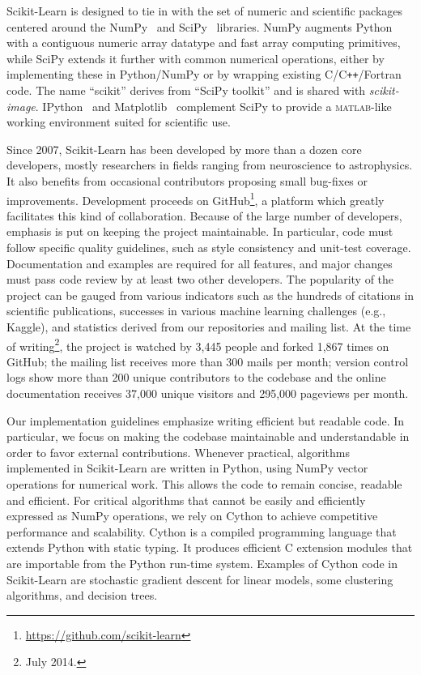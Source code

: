 Scikit-Learn is designed to tie in with the set of numeric and scientific
packages centered around the NumPy~\citep{oliphant:2007} and
SciPy~\citep{vanderwalt:2011} libraries. NumPy augments Python with a
contiguous numeric array datatype and fast array computing primitives, while
SciPy extends it further with common numerical operations, either by
implementing these in Python/NumPy or by wrapping existing
C/C{}\verb!++!/Fortran code. The name ``scikit'' derives from ``SciPy toolkit''
and is shared with \textit{scikit-image}. IPython~\citep{perez:2007} and
Matplotlib~\citep{hunter:2007} complement SciPy to provide a
\textsc{matlab}-like working environment suited for scientific use.

Since 2007, Scikit-Learn has been developed by more than a dozen core
developers, mostly researchers in fields ranging from neuro\-science to
astro\-physics. It also benefits from occasional contributors proposing small
bug-fixes or improvements. Development proceeds on
GitHub\footnote{\url{https://github.com/scikit-learn}}, a platform which
greatly facilitates this kind of collaboration. Because of the large number of
developers, emphasis is put on keeping the project maintainable. In particular,
code must follow specific quality guidelines, such as style consistency and
unit-test coverage. Documentation and examples are required for all features,
and major changes must pass code review by at least two other developers.
The popularity of the project can be gauged from various indicators such as the hundreds
of citations in scientific publications, successes in various machine learning
challenges (e.g., Kaggle), and statistics derived from our
repositories and mailing list.  At the time of writing\footnote{July 2014.}, the project is watched
by 3,445 people and forked 1,867 times on GitHub; the mailing list receives more
than 300 mails per month; version control logs
show more than 200 unique contributors to the codebase and the online documentation
receives 37,000 unique visitors and 295,000 pageviews per month.

Our implementation guidelines emphasize writing efficient but readable code. In
particular, we focus on making the codebase maintainable and understandable in
order to favor external contributions. Whenever practical, algorithms
implemented in Scikit-Learn are written in Python, using NumPy vector
operations for numerical work. This allows the code to remain concise, readable
and efficient. For critical algorithms that cannot be easily and efficiently
expressed as NumPy operations, we rely on Cython \citep{behnel:2011} to achieve
competitive performance and scalability. Cython is a compiled programming
language that extends Python with static typing. It produces efficient C
extension modules that are importable from the Python run-time system. Examples
of Cython code in Scikit-Learn are stochastic gradient descent for linear
models, some clustering algorithms, and decision trees.

